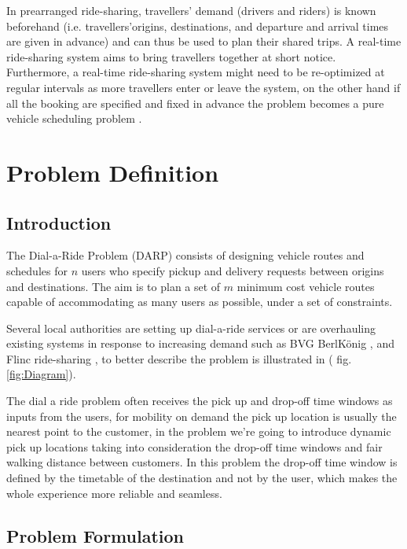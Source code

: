 \documentclass{article}
\begin{document}
In prearranged ride-sharing, travellers’ demand (drivers and riders) is known beforehand (i.e. travellers\rq origins, destinations, and departure and arrival times are given in advance) and can thus be used to plan their shared trips. A real-time ride-sharing system aims to bring travellers together at short notice. Furthermore, a real-time ride-sharing system might need to be re-optimized at regular intervals as more travellers enter or leave the system, on the other hand if all the booking are specified and fixed in advance the problem becomes a pure vehicle scheduling problem \cite{hyland_taxonomy}.



\section{Problem Definition}
\label{sec:Problem_Definition}

\subsection{Introduction}

The Dial-a-Ride Problem (DARP) consists of designing vehicle routes and schedules for $n$ users who specify pickup and delivery requests between origins and destinations. The aim is to plan a set of $m$ minimum cost vehicle routes capable of accommodating as
many users as possible, under a set of constraints.

Several local authorities are setting up dial-a-ride services or are overhauling existing systems in response to increasing demand such as BVG BerlKönig \cite{BerlKonig}, and Flinc ride-sharing \cite{Flinc}, to better describe the problem is illustrated in ( fig. \ref{fig:Diagram}).

The dial a ride problem often receives the pick up and drop-off time windows as inputs from the users, for mobility on demand the pick up location is usually the nearest point to the customer, in the problem we\rq{re} going to introduce dynamic pick up locations taking into consideration the drop-off time windows and fair walking distance between customers.
In this problem the drop-off time window is defined by the timetable of the destination and not by the user, which makes the whole experience more reliable and seamless. 


\subsection{ Problem Formulation}
\label{subsection:problem_setting}
\end{document}
